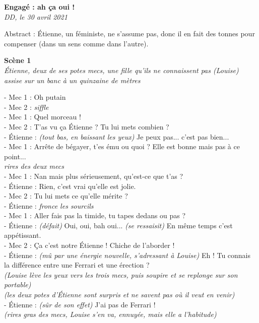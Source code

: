 \documentclass[french,12pt,amstex,a4paper]{article}
\begin{document}
\begin{center}
{\bf Engagé : ah ça oui !}\\
{\it DD, le 30 avril 2021}\\
\end{center}

Abstract : Étienne, un féministe, ne s'assume pas, donc il en fait des tonnes pour compenser (dans un sens comme dans l'autre).\\

\begin{center}
{\bf Scène 1}\\
{\it Étienne, deux de ses potes mecs, une fille qu'ils ne connaissent pas (Louise) assise sur un banc à un quinzaine de mètres}
\end{center}
\noindent - Mec 1 : Oh putain\\
- Mec 2 : {\it siffle}\\
- Mec 1 : Quel morceau !\\
- Mec 2 : T'as vu ça Étienne ? Tu lui mets combien ?\\
- Étienne : {\it (tout bas, en baissant les yeux)} Je peux pas... c'est pas bien...\\
- Mec 1 : Arrête de bégayer, t'es ému ou quoi ? Elle est bonne mais pas à ce point...\\
{\it rires des deux mecs}\\
\noindent - Mec 1 : Nan mais plus sérieusement, qu'est-ce que t'as ?\\
- Étienne : Rien, c'est vrai qu'elle est jolie.\\
- Mec 2 : Tu lui mets ce qu'elle mérite ?\\
- Étienne : {\it fronce les sourcils}\\
- Mec 1 : Aller fais pas la timide, tu tapes dedans ou pas ?\\
- Étienne : {\it (défait)} Oui, oui, bah oui... {\it (se ressaisit)} En même temps c'est appétissant.\\
- Mec 2 : Ça c'est notre Étienne ! Chiche de l'aborder !\\
- Étienne : {\it (mû par une énergie nouvelle, s'adressant à Louise)} Eh ! Tu connais la différence entre une Ferrari et une érection ?\\
{\it (Louise lève les yeux vers les trois mecs, puis soupire et se replonge sur son portable)}\\
{\it (les deux potes d'Étienne sont surpris et ne savent pas où il veut en venir)}\\
- Étienne : {\it (sûr de son effet)} J'ai pas de Ferrari !\\
{\it (rires gras des mecs, Louise s'en va, ennuyée, mais elle a l'habitude)}\\
\end{document}
